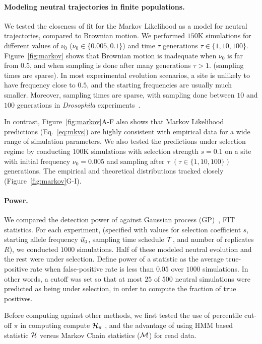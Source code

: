 \documentclass[11pt]{article}
\def\comale{\text{COMALE }}
\begin{document}
\paragraph{Modeling neutral trajectories in finite populations.} 
We tested the closeness of fit for the Markov Likelihood as a model
for neutral trajectories, compared to Brownian motion. We performed
$150$K simulations for different values of $\nu_0$
($\nu_0\in\{0.005,0.1\}$) and time $\tau$ generations $\tau\in
\{1,10,100\}$. Figure~\ref{fig:markov} shows that Brownian motion is
inadequate when $\nu_0$ is far from $0.5$, and when sampling is done
after many generations $\tau>1$. (sampling times are sparse). In most
experimental evolution scenarios, a site is unlikely to have frequency
close to $0.5$, and the starting frequencies are usually much
smaller. Moreover, sampling times are sparse, with sampling done
between $10$ and $100$ generations in \emph{Drosophila}
experiments~\cite{orozco2012adaptation, zhou2011experimental}.

In contrast, Figure~\ref{fig:markov}A-F also shows that Markov
Likelihood predictions (Eq.~\ref{eq:mkvs}) are highly consistent with
empirical data for a wide range of simulation parameters. We also
tested the predictions under selection regime by conducting $100$K
simulations with selection strength $s=0.1$ on a site with initial
frequency $\nu_0=0.005$ and sampling after $\tau$
$(\tau\in\{1,10,100\})$ generations. The empirical and theoretical
distributions tracked closely (Figure~\ref{fig:markov}G-I).

\paragraph{Power.} We compared the detection power of \comale against
Gaussian process (GP)~\cite{Terhorst2015Multi},
FIT~\cite{feder2014Identifying} statistics.  For each experiment,
(specified with values for selection coefficient $s$, starting allele
frequency $\vec{u}_0$, sampling time schedule ${\cal T}$, and number of
replicates $R$), we conducted $1000$ simulations. Half of these
modeled neutral evolution and the rest were under selection. Define
power of a statistic as the average true-positive rate when
false-positive rate is less than $0.05$ over $1000$ simulations. In
other words, a cutoff was set so that at most $25$ of $500$ neutral
simulations were predicted as being under selection, in order to
compute the fraction of true positives. 

Before computing against other methods, we first tested the use of
percentile cut-off $\pi$ in computing compute ${\cal H}_{\pi}$ , and the advantage of using HMM based statistic
${\cal H}$ versus Markov Chain statistics (${\cal M}$) for read data.
\end{document}
